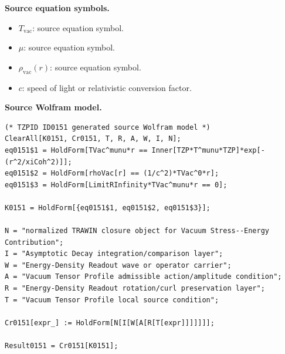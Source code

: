 \begin{minipage}[t]{0.49\linewidth}
\begingroup
\small
\raggedright
\textbf{Source equation symbols.}\par
\begin{itemize}[leftmargin=1.35em,itemsep=1pt,topsep=1pt,parsep=0pt]
    \item $T_{\mathrm{vac}}$: source equation symbol.
    \item $\mu$: source equation symbol.
    \item $\rho_{\mathrm{vac}}(r)$: source equation symbol.
    \item $c$: speed of light or relativistic conversion factor.
\end{itemize}
\endgroup
\end{minipage}\hfill
\begin{minipage}[t]{0.47\linewidth}
\begingroup
\scriptsize
\raggedright
\textbf{Source Wolfram model.}\par
\begin{Verbatim}[fontsize=\tiny,breaklines=true,breakanywhere=true]
(* TZPID ID0151 generated source Wolfram model *)
ClearAll[K0151, Cr0151, T, R, A, W, I, N];
eq0151$1 = HoldForm[TVac^munu*r == Inner[TZP*T^munu*TZP]*exp[-(r^2/xiCoh^2)]];
eq0151$2 = HoldForm[rhoVac[r] == (1/c^2)*TVac^0*r];
eq0151$3 = HoldForm[LimitRInfinity*TVac^munu*r == 0];

K0151 = HoldForm[{eq0151$1, eq0151$2, eq0151$3}];

N = "normalized TRAWIN closure object for Vacuum Stress--Energy Contribution";
I = "Asymptotic Decay integration/comparison layer";
W = "Energy-Density Readout wave or operator carrier";
A = "Vacuum Tensor Profile admissible action/amplitude condition";
R = "Energy-Density Readout rotation/curl preservation layer";
T = "Vacuum Tensor Profile local source condition";

Cr0151[expr_] := HoldForm[N[I[W[A[R[T[expr]]]]]]];

Result0151 = Cr0151[K0151];
\end{Verbatim}
\endgroup
\end{minipage}


